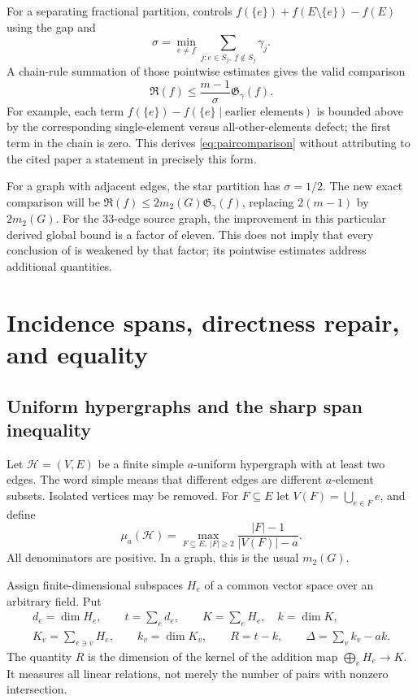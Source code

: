 \documentclass[11pt]{article}
\theoremstyle{definition}
\theoremstyle{remark}
\newcommand{\1}{\mathbf 1}
\newcommand{\Red}{\mathfrak R}
\newcommand{\Gap}{\mathfrak G}
\begin{document}
For a separating fractional partition, \cite[Theorem 3]{Jakhar2025} controls
$f(\{e\})+f(E\setminus\{e\})-f(E)$ using the gap and
\[
 \sigma=\min_{e\ne f}\sum_{j:e\in S_j,\ f\notin S_j}\gamma_j.
\]
A chain-rule summation of those pointwise estimates gives the valid comparison
\begin{equation}
 \Red(f)\le\frac{m-1}{\sigma}\Gap_\gamma(f).
 \label{eq:paircomparison}
\end{equation}
For example, each term
$f(\{e\})-f(\{e\}\mid\text{earlier elements})$ is bounded above by the
corresponding single-element versus all-other-elements defect; the first term
in the chain is zero. This derives \eqref{eq:paircomparison} without attributing
to the cited paper a statement in precisely this form.

For a graph with adjacent edges, the star partition has $\sigma=1/2$.
The new exact comparison will be
$\Red(f)\le 2m_2(G)\Gap_\gamma(f)$, replacing $2(m-1)$ by $2m_2(G)$.
For the 33-edge source graph, the improvement in this particular derived global
bound is a factor of eleven. This does not imply that every conclusion of
\cite{Jakhar2025} is weakened by that factor; its pointwise estimates address
additional quantities.

\section{Incidence spans, directness repair, and equality}
\label{sec:spans}

\subsection{Uniform hypergraphs and the sharp span inequality}

Let $\mathcal H=(V,E)$ be a finite simple $a$-uniform hypergraph with at least
two edges. The word simple means that different edges are different $a$-element
subsets. Isolated vertices may be removed. For $F\subseteq E$ let
$V(F)=\bigcup_{e\in F}e$, and define
\begin{equation}
 \mu_a(\mathcal H)=\max_{F\subseteq E,\ |F|\ge2}
 \frac{|F|-1}{|V(F)|-a}.
 \label{eq:adensity}
\end{equation}
All denominators are positive. In a graph, this is the usual $m_2(G)$.

Assign finite-dimensional subspaces $H_e$ of a common vector space over an
arbitrary field. Put
\begin{equation}
 \begin{gathered}
 d_e=\dim H_e,\qquad t=\sum_e d_e,\qquad
 K=\sum_eH_e,\quad k=\dim K,\\
 K_v=\sum_{e\ni v}H_e,\qquad k_v=\dim K_v,\qquad
 R=t-k,\qquad \Delta=\sum_v k_v-a k.
 \end{gathered}
 \label{eq:spanparameters}
\end{equation}
The quantity $R$ is the dimension of the kernel of the addition map
$\bigoplus_eH_e\to K$. It measures all linear relations, not merely the number
of pairs with nonzero intersection.
\end{document}
